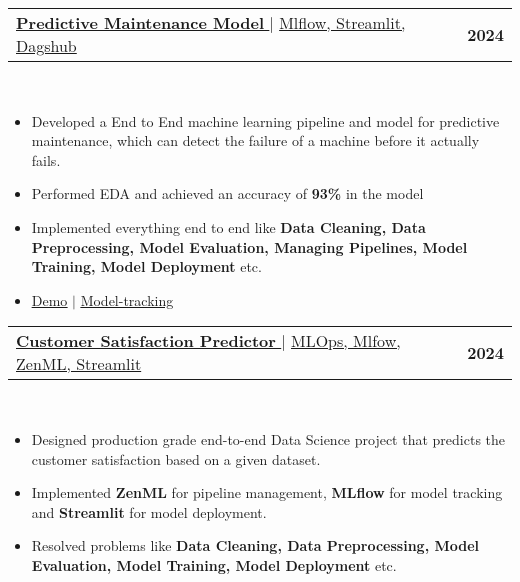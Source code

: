 \documentclass[letterpaper,11pt]{article}
\makeatletter
\newcommand{\resumeItem}[1]{
  \item\small{
    {#1 \vspace{-2pt}}
  }
}
\newcommand{\resumeProjectHeading}[2]{
    \item
    \begin{tabular*}{1.001\textwidth}{l@{\extracolsep{\fill}}r}
      \small#1 & \textbf{\small #2}\\
    \end{tabular*}\vspace{-7pt}
}
\newcommand{\resumeItemListStart}{\begin{itemize}}
\newcommand{\resumeItemListEnd}{\end{itemize}\vspace{-5pt}}
\makeatother
\begin{document}
      \resumeProjectHeading
        {\href{https://github.com/typhonshambo/End-to-End-ML-Pipeline-for-Predictive-Maintenance/tree/main}{\textbf{\large{\underline{\textbf{Predictive Maintenance Model}}}} \href{Project Link}{\raisebox{-0.1\height}\faExternalLink }} $|$ \large{\underline{Mlflow, Streamlit, Dagshub}}}{2024}\\
        \resumeItemListStart
          \resumeItem{\normalsize{Developed a End to End machine learning pipeline and model for predictive maintenance, which can detect the failure of a machine before it actually fails.}}
          \resumeItem{\normalsize{Performed EDA and achieved an accuracy of \textbf{93\%} in the model}}
          \resumeItem{\normalsize{Implemented everything end to end like \textbf{Data Cleaning, Data Preprocessing, Model Evaluation, Managing Pipelines, Model Training, Model Deployment} etc.}}
          
          
          \resumeItem{\normalsize{\href{https://typhonshambo-predictive-maintenance.streamlit.app}{\underline{Demo}} \href{Project Link}{\raisebox{-0.1\height}\faExternalLink }} $|$ \href{https://dagshub.com/typhonshambo/End-to-End-ML-Pipeline-for-Predictive-Maintenance.mlflow}{\underline{Model-tracking}} \href{Project Link}{\raisebox{-0.1\height}\faExternalLink }}
          

        \resumeItemListEnd 
        \vspace{-13pt}
  
                  
      \resumeProjectHeading
      {\href{https://github.com/typhonshambo/customer-satisfaction-predictor}{\textbf{\large{\underline{\textbf{Customer Satisfaction Predictor}}}} \href{Project Link}{\raisebox{-0.1\height}\faExternalLink }} $|$ \large{\underline{MLOps, Mlfow, ZenML, Streamlit}}}{2024}\\
      \resumeItemListStart
        \resumeItem {\normalsize{Designed production grade end-to-end Data Science project that predicts the customer satisfaction based on a given dataset.}}
        \resumeItem{\normalsize{Implemented \textbf{ZenML} for pipeline management, \textbf{MLflow} for model tracking and \textbf{Streamlit} for model deployment.}}
        \resumeItem{\normalsize{Resolved problems like \textbf{Data Cleaning, Data Preprocessing, Model Evaluation, Model Training, Model Deployment} etc.}}
      \resumeItemListEnd 
      \vspace{-13pt}
      
\end{document}
